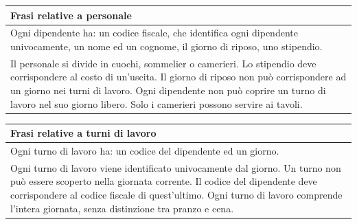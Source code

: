 \begin{longtable}{|p{15.5cm}|}
    \hline
    \textbf{Frasi relative a personale} \\ \hline
    Ogni dipendente ha: un codice fiscale, che identifica ogni dipendente univocamente, un nome ed un cognome, il giorno di riposo, uno stipendio. \\
    Il personale si divide in cuochi, sommelier o camerieri.
    Lo stipendio deve corrispondere al costo di un’uscita.
    Il giorno di riposo non può corrispondere ad un giorno nei turni di lavoro.
    Ogni dipendente non può coprire un turno di lavoro nel suo giorno libero.
    Solo i camerieri possono servire ai tavoli.
    \\ \hline
\end{longtable}

\begin{longtable}{|p{15.5cm}|}
    \hline
    \textbf{Frasi relative a turni di lavoro} \\ \hline
    Ogni turno di lavoro ha: un codice del dipendente ed un giorno. \\
    Ogni turno di lavoro viene identificato univocamente dal giorno.
    Un turno non può essere scoperto nella giornata corrente.
    Il codice del dipendente deve corrispondere al codice fiscale di quest’ultimo.
    Ogni turno di lavoro comprende l’intera giornata, senza distinzione tra pranzo e cena.
    \\ \hline
\end{longtable}



